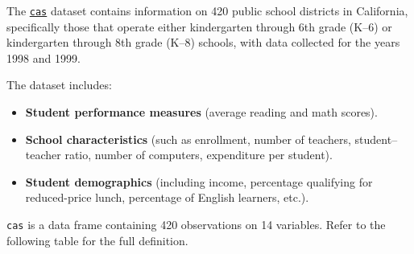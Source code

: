 \documentclass[
  12pt,
  letterpaper,
]{scrbook}
\providecommand{\tightlist}{%
  \setlength{\itemsep}{0pt}\setlength{\parskip}{0pt}}
\renewcommand{\tightlist}{\setlength{\itemsep}{0.5\baselineskip}\setlength{\parskip}{0.2\baselineskip}}
\theoremstyle{definition}
\theoremstyle{plain}
\theoremstyle{remark}
\begin{document}
The
\href{https://www.rdocumentation.org/packages/AER/versions/1.2-15/topics/CASchools}{\texttt{cas}}
dataset contains information on 420 public school districts in
California, specifically those that operate either kindergarten through
6th grade (K--6) or kindergarten through 8th grade (K--8) schools, with
data collected for the years 1998 and 1999.

The dataset includes:

\begin{itemize}
\tightlist
\item
  \textbf{Student performance measures} (average reading and math
  scores).
\item
  \textbf{School characteristics} (such as enrollment, number of
  teachers, student--teacher ratio, number of computers, expenditure per
  student).
\item
  \textbf{Student demographics} (including income, percentage qualifying
  for reduced-price lunch, percentage of English learners, etc.).
\end{itemize}

\texttt{cas} is a data frame containing 420 observations on 14
variables. Refer to the following table for the full definition.
\end{document}
